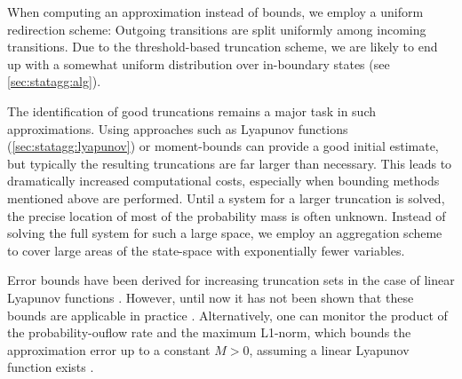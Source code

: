 When computing an approximation instead of bounds, we employ a uniform redirection scheme:
Outgoing transitions are split uniformly among incoming transitions.
Due to the threshold-based truncation scheme, we are likely to end up with a somewhat uniform distribution over in-boundary states (see \autoref{sec:statagg:alg}).


The identification of good truncations remains a major task in such approximations.
Using approaches such as Lyapunov functions (\autoref{sec:statagg:lyapunov}) \cite{dayar2011bounding} or moment-bounds \cite{kuntz2021approximations} can provide a good initial estimate, but typically the resulting truncations are far larger than necessary.
This leads to dramatically increased computational costs, especially when bounding methods mentioned above are performed.
Until a system for a larger truncation is solved, the precise location of  most of the probability mass is often unknown.
Instead of solving the full system for such a large space, we employ an aggregation scheme to cover large areas of the state-space with exponentially fewer variables.

Error bounds have been derived for increasing  truncation sets 
in the case of linear Lyapunov functions  \cite{gupta2017finite}.
However, until now it has not been shown that these bounds are applicable in practice \cite{meyn1994computable}.
Alternatively, one can monitor the product of the probability-ouflow rate and the maximum L1-norm, which bounds the approximation error up to a constant $M>0$, assuming a linear Lyapunov function exists \cite{gupta2017finite}.


